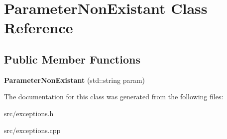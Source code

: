 \hypertarget{class_parameter_non_existant}{
\section{ParameterNonExistant Class Reference}
\label{class_parameter_non_existant}
}
\subsection*{Public Member Functions}
\begin{DoxyCompactItemize}
\item 
\hypertarget{class_parameter_non_existant_a9212d1eca697f65c6de5cd43f7565dbb}{
{\bfseries ParameterNonExistant} (std::string param)}
\label{class_parameter_non_existant_a9212d1eca697f65c6de5cd43f7565dbb}

\end{DoxyCompactItemize}


The documentation for this class was generated from the following files:\begin{DoxyCompactItemize}
\item 
src/exceptions.h\item 
src/exceptions.cpp\end{DoxyCompactItemize}
